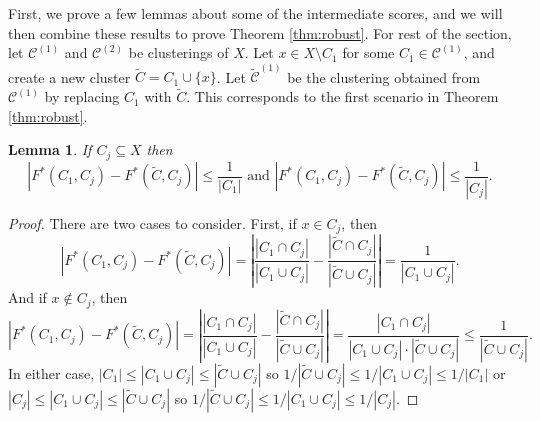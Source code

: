 \documentclass[review,los,12pt]{ryethesis}
\newtheorem{lemma}[theorem]{Lemma}
\newcommand\cCone{\mathcal{C}^{(1)}}
\newcommand\tcCone{\tilde{\mathcal{C}}^{(1)}}
\newcommand\cCtwo{\mathcal{C}^{(2)}}
\begin{document}
First, we prove a few lemmas about some of the intermediate scores, and we will then combine these results to prove Theorem \ref{thm:robust}.
For rest of the section, let $\cCone$ and $\cCtwo$ be clusterings of $X$. 
Let $x \in X \setminus C_1$ for some $C_1 \in \cCone$, and create a new cluster $\tilde{C} = C_1 \cup \{x\}$.
Let $\tcCone$ be the clustering obtained from $\cCone$ by replacing $C_1$ with $\tilde{C}$.
This corresponds to the first scenario in Theorem \ref{thm:robust}.
\begin{lemma}\label{lem:one}
    If $C_j \subseteq X$ then
    \begin{equation*}
        \left|F^*(C_1, C_j) - F^*(\tilde{C}, C_j)\right| \leq \frac{1}{|C_1|} \text{ and } \left|F^*(C_1, C_j) - F^*(\tilde{C}, C_j)\right| \leq \frac{1}{|C_j|}.
    \end{equation*}
\end{lemma}
\begin{proof}
    There are two cases to consider. First, if $x \in C_j$, then
    \begin{equation*}
        \left|F^*(C_1, C_j) - F^*(\tilde{C}, C_j)\right| = \left| \frac{|C_1 \cap C_j|}{|C_1 \cup C_j|} - \frac{|\tilde{C} \cap C_j|}{|\tilde{C} \cup C_j|} \right| = \frac{1}{|C_1 \cup C_j|}.
    \end{equation*}
    And if $x \not \in C_j$, then
    \begin{equation*}
        \left|F^*(C_1, C_j) - F^*(\tilde{C}, C_j)\right| = \left| \frac{|C_1 \cap C_j|}{|C_1 \cup C_j|} - \frac{|\tilde{C}  \cap C_j|}{|\tilde{C} \cup C_j|} \right| = \frac{|C_1 \cap C_j|}{|C_1 \cup C_j| \cdot |\tilde{C} \cup C_j|} \leq \frac{1}{|\tilde{C} \cup C_j|}.
    \end{equation*}
    In either case, $|C_1| \leq |C_1 \cup C_j| \leq |\tilde{C} \cup C_j|$ so $1 / |\tilde{C} \cup C_j| \leq 1 / |C_1 \cup C_j| \leq 1/ |C_1|$ or $|C_j| \leq |C_1 \cup C_j| \leq |\tilde{C} \cup C_j|$ so $1 / |\tilde{C} \cup C_j| \leq 1 / |C_1 \cup C_j| \leq 1/ |C_j|$.
\end{proof}
\end{document}
